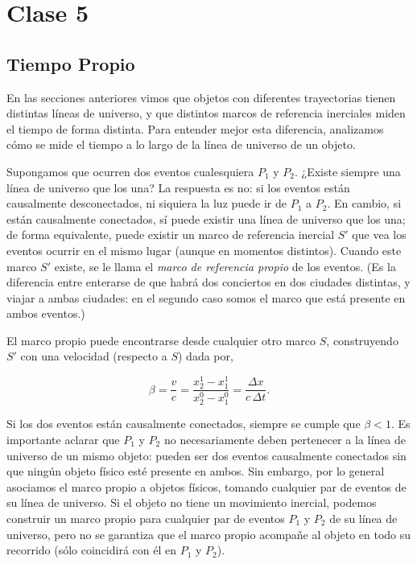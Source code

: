 \chapter{Clase 5}

\section{Tiempo Propio}

En las secciones anteriores vimos que objetos con diferentes trayectorias tienen distintas líneas de universo, y que distintos marcos de referencia inerciales miden el tiempo de forma distinta. Para entender mejor esta diferencia, analizamos cómo se mide el tiempo a lo largo de la línea de universo de un objeto.

Supongamos que ocurren dos eventos cualesquiera $P_1$ y $P_2$. ¿Existe siempre una línea de universo que los una? La respuesta es no: si los eventos están causalmente desconectados, ni siquiera la luz puede ir de $P_1$ a $P_2$. En cambio, si están causalmente conectados, sí puede existir una línea de universo que los una; de forma equivalente, puede existir un marco de referencia inercial $S'$ que vea los eventos ocurrir en el mismo lugar (aunque en momentos distintos). Cuando este marco $S'$ existe, se le llama el \emph{marco de referencia propio} de los eventos. (Es la diferencia entre enterarse de que habrá dos conciertos en dos ciudades distintas, y viajar a ambas ciudades: en el segundo caso somos el marco que está presente en ambos eventos.)

El marco propio puede encontrarse desde cualquier otro marco $S$, construyendo $S'$ con una velocidad (respecto a $S$) dada por,

$$
\beta = \frac{v}{c} = \frac{x^1_2 - x^1_1}{x^0_2 - x^0_1} = \frac{\Delta x}{c\,\Delta t}.
$$

Si los dos eventos están causalmente conectados, siempre se cumple que $\beta < 1$. Es importante aclarar que $P_1$ y $P_2$ no necesariamente deben pertenecer a la línea de universo de un mismo objeto: pueden ser dos eventos causalmente conectados sin que ningún objeto físico esté presente en ambos. Sin embargo, por lo general asociamos el marco propio a objetos físicos, tomando cualquier par de eventos de su línea de universo. Si el objeto no tiene un movimiento inercial, podemos construir un marco propio para cualquier par de eventos $P_1$ y $P_2$ de su línea de universo, pero no se garantiza que el marco propio acompañe al objeto en todo su recorrido (sólo coincidirá con él en $P_1$ y $P_2$).

